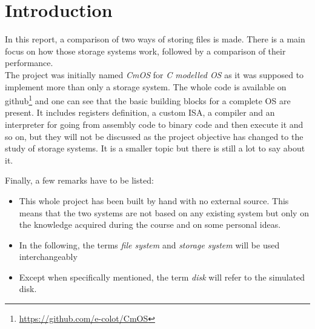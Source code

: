 \documentclass[10pt,a4paper]{ULBreport}
\begin{document}
 





\chapter{Introduction}

In this report, a comparison of two ways of storing files is made. There is a main focus on how those storage systems work, followed by a comparison of their performance. \\

The project was initially named \textit{CmOS} for \textit{C modelled OS} as it was supposed to implement more than only a storage system. The whole code is available on github\footnote{\href{https://github.com/e-colot/CmOS}{https://github.com/e-colot/CmOS}} and one can see that the basic building blocks for a complete OS are present. It includes registers definition, a custom ISA, a compiler and an interpreter for going from assembly code to binary code and then execute it and so on, but they will not be discussed as the project objective has changed to the study of storage systems. It is a smaller topic but there is still a lot to say about it. 

Finally, a few remarks have to be listed:
\begin{itemize}
    \item This whole project has been built by hand with no external source. This means that the two systems are not based on any existing system but only on the knowledge acquired during the course and on some personal ideas.
    \item In the following, the terms \textit{file system} and \textit{storage system} will be used interchangeably
    \item Except when specifically mentioned, the term \textit{disk} will refer to the simulated disk.
\end{itemize}
\end{document}
